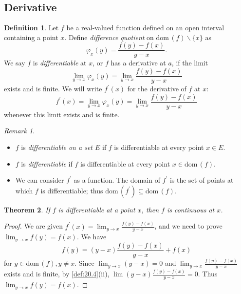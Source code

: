 \documentclass[12pt, lettersize]{book}
\theoremstyle{plain}
\newtheorem{thm}{Theorem}[section]
\theoremstyle{definition}
\newtheorem{dfn}[thm]{Definition}
\theoremstyle{remark}
\newtheorem*{rem}{Remark}
\newcommand{\dom}{\text{dom}\,}
\begin{document}
			\subsection*{Derivative}
			\begin{dfn}\label{def:28.1}
			Let $f$ be a real-valued function defined on an open interval containing a point $x$. Define \emph{difference quotient} on $\dom(f)\backslash\{x\}$ as 
			\begin{displaymath}
				\varphi_x(y)=\frac{f(y)-f(x)}{y-x}.
			\end{displaymath}
			We say $f$ is \emph{differentiable} at $x$, or $f$ has a derivative at $a$, if the limit
			\begin{displaymath}
				\lim_{y\rightarrow x}\varphi_x(y)=\lim_{y\rightarrow x}\frac{f(y)-f(x)}{y-x}
			\end{displaymath}
			exists and is finite. We will write $f^\prime(x)$ for the derivative of $f$ at $x$:
			\begin{displaymath}
				f^\prime(x)=\lim_{y\rightarrow x}\varphi_x(y)=\lim_{y\rightarrow x}\frac{f(y)-f(x)}{y-x}
			\end{displaymath}
			whenever this limit exists and is finite.
			\end{dfn}
			\begin{rem}
			\begin{itemize}
				\item $f$ is \emph{differentiable on a set $E$} if $f$ is differentiable at every point $x\in E$.
				\item $f$ is \emph{differentiable} if $f$ is differentiable at every point $x\in\dom(f)$.
				\item We can consider $f^\prime$ as a function. The domain of $f^\prime$ is the set of points at which $f$ is differentiable; thus $\dom(f^\prime)\subseteq\dom(f)$.
			\end{itemize}
			\end{rem}
			
			\begin{thm}\label{thm:28.2}
			If $f$ is differentiable at a point $x$, then $f$ is continuous at $x$.
			\end{thm}
			\begin{proof}
			We are given $f^\prime(x)=\lim_{y\rightarrow x}\frac{f(y)-f(x)}{y-x}$, and we need to prove $\lim_{y\rightarrow x}f(y)=f(x)$. We have 
			\begin{displaymath}
				f(y)=(y-x)\frac{f(y)-f(x)}{y-x}+f(x)
			\end{displaymath}
			for $y\in\dom(f), y\neq x$. Since $\lim_{y\rightarrow x}(y-x)=0$ and $\lim_{y\rightarrow x}\frac{f(y)-f(x)}{y-x}$ exists and is finite, by \ref{def:20.4}(ii), $\lim (y-x)\frac{f(y)-f(x)}{y-x}=0$. Thus $\lim_{y\rightarrow x}f(y)=f(x)$.
			\end{proof}
			\newpage
			
\end{document}
